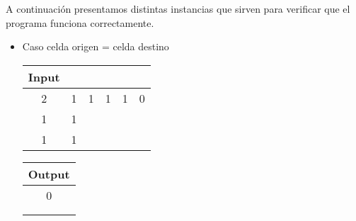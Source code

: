 \documentclass[11pt, a4paper, twoside]{article}
\begin{document}
{}
A continuaci\'on presentamos distintas instancias que sirven para verificar que el programa funciona correctamente.\\

\begin{itemize}
\item Caso celda origen = celda destino \\
	 \begin{minipage}{0.4\textwidth}
		\begin{tabular}{cccccc}
		   Input \\
		   \hline
		   2 & 1 & 1& 1 & 1 & 0\\
		   1 & 1 &  &   &   &  \\
		   1 & 1 &  &   &   &  \\
		\end{tabular}
	\end{minipage} 
		\begin{minipage}{0.2\textwidth}
			\begin{tabular}{c}
			   Output \\
			   \hline
			   0 \\
				 \\
				 \\
		\end{tabular}
	\end{minipage} 


\end{itemize}
\end{document}
